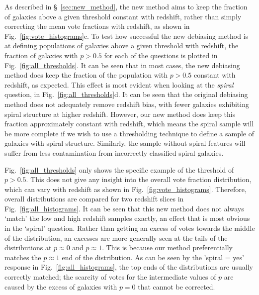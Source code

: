 \documentclass[useAMS,usenatbib]{mn2e}
\begin{document}
As described in \S~\ref{sec:new_method}, the new method aims to keep the fraction of galaxies above a given threshold constant with redshift, rather than simply correcting the mean vote fractions with redshift, as shown in Fig.~\ref{fig:vote_histograms}c. To test how successful the new debiasing method is at defining populations of galaxies above a given threshold with redshift, the fraction of galaxies with $p>0.5$ for each of the questions is plotted in Fig.~\ref{fig:all_thresholds}. It can be seen that in most cases, the new debiasing method does keep the fraction of the population with $p>0.5$ constant with redshift, as expected. This effect is most evident when looking at the \textit{spiral} question, in Fig.~\ref{fig:all_thresholds}d. It can be seen that the original debiasing method does not adequately remove redshift bias, with fewer galaxies exhibiting spiral structure at higher redshift. However, our new method does keep this fraction approximately constant with redshift, which means the spiral sample will be more complete if we wish to use a thresholding technique to define a sample of galaxies with spiral structure. Similarly, the sample without spiral features will suffer from less contamination from incorrectly classified spiral galaxies.

Fig.~\ref{fig:all_thresholds} only shows the specific example of the threshold of $p>0.5$. This does not give any insight into the overall vote fraction distribution, which can vary with redshift as shown in Fig.~\ref{fig:vote_histograms}. Therefore, overall distributions are compared for two redshift slices in Fig.~\ref{fig:all_histograms}. It can be seen that this new method does not always `match' the low and high redshift samples exactly, an effect that is most obvious in the `spiral' question. Rather than getting an excess of votes towards the middle of the distribution, an excesses are more generally seen at the tails of the distributions at $p \approx 0$ and $p \approx 1$. This is because our method preferentially matches the $p \approx 1$ end of the distribution. As can be seen by the 'spiral = yes' response in Fig.~\ref{fig:all_histograms}, the top ends of the distributions are usually correctly matched; the scarcity of votes for the intermediate values of $p$ are caused by the excess of galaxies with $p=0$ that cannot be corrected. 

\end{document}
